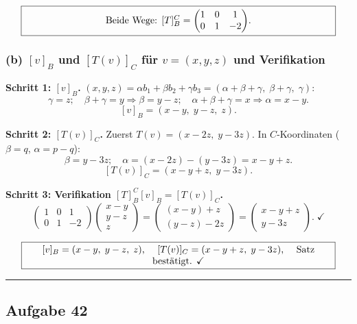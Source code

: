 \documentclass[a4paper,12pt]{article}
\begin{document}
\[
\fbox{\parbox{0.93\textwidth}{\centering
Beide Wege: $[T]_B^C = \begin{pmatrix} 1 & 0 & 1 \\ 0 & 1 & -2 \end{pmatrix}$.
}}
\]

\subsubsection*{(b) $[v]_B$ und $[T(v)]_C$ f\"ur $v = (x, y, z)$ und Verifikation}

\textbf{Schritt 1: $[v]_B$.} $(x,y,z) = \alpha b_1 + \beta b_2 + \gamma b_3 = (\alpha + \beta + \gamma,\; \beta + \gamma,\; \gamma)$:
\[
\gamma = z; \quad \beta + \gamma = y \Rightarrow \beta = y - z; \quad \alpha + \beta + \gamma = x \Rightarrow \alpha = x - y.
\]
\[
[v]_B = (x - y,\; y - z,\; z).
\]

\textbf{Schritt 2: $[T(v)]_C$.} Zuerst $T(v) = (x - 2z,\; y - 3z)$. In $C$-Koordinaten ($\beta = q$, $\alpha = p - q$):
\[
\beta = y - 3z; \quad \alpha = (x - 2z) - (y - 3z) = x - y + z.
\]
\[
[T(v)]_C = (x - y + z,\; y - 3z).
\]

\textbf{Schritt 3: Verifikation $[T]_B^C [v]_B = [T(v)]_C$.}
\[
\begin{pmatrix} 1 & 0 & 1 \\ 0 & 1 & -2 \end{pmatrix}\begin{pmatrix} x - y \\ y - z \\ z \end{pmatrix}
= \begin{pmatrix} (x-y) + z \\ (y-z) - 2z \end{pmatrix}
= \begin{pmatrix} x - y + z \\ y - 3z \end{pmatrix}. \;\checkmark
\]

\[
\fbox{\parbox{0.93\textwidth}{\centering
$[v]_B = (x-y,\; y-z,\; z)$, \quad $[T(v)]_C = (x-y+z,\; y-3z)$, \quad Satz best\"atigt. \checkmark
}}
\]

\bigskip
\hrule
\bigskip

\subsection*{Aufgabe 42}
\end{document}
